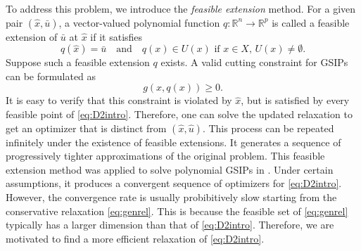 \documentclass{amsart}
\theoremstyle{plain}
\newcommand{\re}{\mathbb{R}}
\numberwithin{equation}{section}
\begin{document}
	To address this problem, we introduce the \emph{feasible extension} method.
        For a given pair $(\hat{x}, \bar{u})$, a vector-valued polynomial function 
        $q: \re^n\to \re^p$ is called a feasible extension of $\bar{u}$ at $\hat{x}$ 
        if it satisfies
	\[
	q(\hat{x}) = \bar{u}\quad\mbox{and}\quad q(x)\in U(x)\,
	\,\mbox{if $x\in X,\, U(x)\not=\emptyset$} .
	\]
	Suppose such a feasible extension $q$ exists. A valid cutting constraint for
        GSIPs can be formulated as
	\[
	g(x,q(x)) \ge 0.
	\]
        It is easy to verify that this constraint is violated by $\hat{x}$,
        but is satisfied by every feasible point of \eqref{eq:D2intro}.
        Therefore, one can solve the updated relaxation to get an optimizer
        that is distinct from $(\hat{x}, \hat{u})$. This process can be 
        repeated infinitely under the existence of feasible extensions.
        It generates a sequence of progressively tighter approximations 
        of the original problem.
	This feasible extension method was applied to solve polynomial GSIPs in \cite{HuNie23}. 
	Under certain assumptions, it produces a 
        convergent sequence of optimizers for \eqref{eq:D2intro}.
	However, the convergence rate is usually probibitively slow starting from the conservative
	relaxation \eqref{eq:genrel}. This is because the feasible set of \eqref{eq:genrel} 
	typically has a larger dimension than that of \eqref{eq:D2intro}. 
        Therefore, we are motivated to find a more efficient relaxation of \eqref{eq:D2intro}.
	
	
\end{document}
